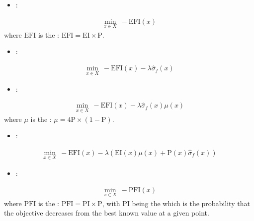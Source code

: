 \documentclass[letterpaper,10pt,english]{sphinxmanual}
\begin{document}
\begin{itemize}
\item {} 
\sphinxAtStartPar
{}:

\end{itemize}
\begin{equation*}
\begin{split}\min_{x\in X}\ -\mathrm{EFI}(x)\end{split}
\end{equation*}
\sphinxAtStartPar
where \(\mathrm{EFI}\) is the  : \(\mathrm{EFI} = \mathrm{EI}\times\mathrm{P}\).
\begin{itemize}
\item {} 
\sphinxAtStartPar
{}:

\end{itemize}
\begin{equation*}
\begin{split}\min_{x\in X}\ -\mathrm{EFI}(x)-\lambda\hat\sigma_f(x)\end{split}
\end{equation*}\begin{itemize}
\item {} 
\sphinxAtStartPar
{}:

\end{itemize}
\begin{equation*}
\begin{split}\min_{x\in X}\ -\mathrm{EFI}(x)-\lambda\hat\sigma_f(x)\mu(x)\end{split}
\end{equation*}
\sphinxAtStartPar
where \(\mu\) is the  : \(\mu = 4\mathrm{P}\times(1-\mathrm{P})\).
\begin{itemize}
\item {} 
\sphinxAtStartPar
{}:

\end{itemize}
\begin{equation*}
\begin{split}\min_{x\in X}\ -\mathrm{EFI}(x)-\lambda(\mathrm{EI}(x)\mu(x)
+\mathrm{P}(x)\hat\sigma_f(x))\end{split}
\end{equation*}\begin{itemize}
\item {} 
\sphinxAtStartPar
{}:

\end{itemize}
\begin{equation*}
\begin{split}\min_{x\in X}\ -\mathrm{PFI}(x)\end{split}
\end{equation*}
\sphinxAtStartPar
where \(\mathrm{PFI}\) is the  : \(\mathrm{PFI} = \mathrm{PI}\times\mathrm{P}\),
with \(\mathrm{PI}\) being the  which is the probability that the objective decreases from the best known value at a given point.
\end{document}
